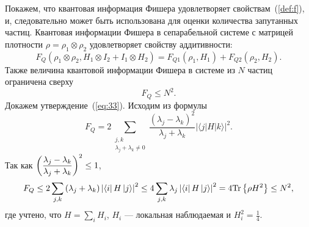 Покажем, что квантовая информация Фишера удовлетворяет свойствам~(\ref{def:f}),
и, следовательно может быть использована для оценки количества запутанных частиц.
Квантовая информации Фишера в сепарабельной системе с матрицей плотности $\rho = \rho_1 \otimes \rho_2$ удовлетворяет свойству аддитивности:
%
\begin{equation}\label{eq:31}
  F_Q(\rho_1 \otimes \rho_2 ,H_1 \otimes I_2 + I_1 \otimes H_2) =
      F_{Q1} (\rho_1, H_1) + F_{Q2} (\rho_2 , H_2).
\end{equation}
%
Также величина квантовой информации Фишера в системе из $N$ частиц
ограничена сверху\:
%
\begin{equation}\label{eq:33}
  F_Q \leq N^2.
\end{equation}
%
Докажем утверждение~(\ref{eq:33}).
Исходим из формулы
%
\begin{equation}\label{eq:34}
  F_Q = 2\sum_{\substack{j,k \\ \lambda_j + \lambda_k \neq 0}}
  \frac{(\lambda_j - \lambda_k)^2}{\lambda_j + \lambda_k}
  \left| \langle j|H|k \rangle \right|^2.
\end{equation}
%
Так как
$\left( \dfrac{\lambda_j - \lambda_k}{\lambda_j +\lambda_k} \right)^2 \leq 1$,
\begin{equation}
  F_Q \leq 2\sum_{j,k} \left( \lambda_j + \lambda_k \right) \left| \left\langle i \right| H \left| j \right\rangle \right|^2
  \leq 4\sum_{j,k} \lambda_j \left| \left\langle i \right| H \left| j \right\rangle \right|^2
  = 4 \mathrm{Tr} \left\{ \rho H^2 \right\}
  \leq N^2,
\end{equation}
где учтено, что $H = \sum_i H_i$,
$H_i$ --- локальная наблюдаемая и $H_i^2 = \frac 1 4$.

